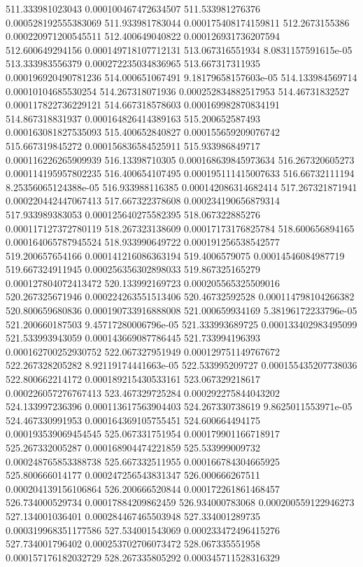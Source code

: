 {511.333981023043 0.000100467472634507
511.533981276376 0.000528192555383069
511.933981783044 0.000175408174159811
512.2673155386 0.000220971200545511
512.400649040822 0.000126931736207594
512.600649294156 0.000149718107712131
513.067316551934 8.0831157591615e-05
513.333983556379 0.000272235034836965
513.667317311935 0.000196920490781236
514.000651067491 9.18179658157603e-05
514.133984569714 0.00010104685530254
514.267318071936 0.000252834882517953
514.46731832527 0.000117822736229121
514.667318578603 0.000169982870834191
514.867318831937 0.000164826414389163
515.200652587493 0.000163081827535093
515.400652840827 0.000155659209076742
515.667319845272 0.000156836584525911
515.933986849717 0.000116226265909939
516.13398710305 0.000168639845973634
516.267320605273 0.000114195957802235
516.400654107495 0.000195111415007633
516.66732111194 8.25356065124388e-05
516.933988116385 0.000142086314682414
517.267321871941 0.000220442447067413
517.667322378608 0.000234190656879314
517.933989383053 0.000125640275582395
518.067322885276 0.000117127372780119
518.267323138609 0.00017173176825784
518.600656894165 0.000164065787945524
518.933990649722 0.000191256538542577
519.200657654166 0.000141216086363194
519.4006579075 0.00014546084987719
519.667324911945 0.000256356302898033
519.867325165279 0.000127804072413472
520.133992169723 0.000205565325509016
520.267325671946 0.000224263551513406
520.46732592528 0.000114798104266382
520.800659680836 0.000190733916888008
521.000659934169 5.38196172233796e-05
521.200660187503 9.45717280006796e-05
521.333993689725 0.000133402983495099
521.533993943059 0.000143669087786445
521.733994196393 0.000162700252930752
522.067327951949 0.000129751149767672
522.267328205282 8.92119174441663e-05
522.533995209727 0.000155435207738036
522.800662214172 0.000189215430533161
523.067329218617 0.000226057276767413
523.467329725284 0.000292275844043202
524.133997236396 0.000113617563904403
524.267330738619 9.8625011553971e-05
524.467330991953 0.000164369105755451
524.600664494175 0.000193539069454545
525.067331751954 0.000179901166718917
525.267332005287 0.000168904474221859
525.533999009732 0.000248765853388738
525.667332511955 0.000166784304665925
525.800666014177 0.000247256543831347
526.000666267511 0.000204139156106864
526.200666520844 0.000172261861468457
526.734000529734 0.00017884209862459
526.934000783068 0.000200559122946273
527.134001036401 0.000284467465503948
527.334001289735 0.000319968351177586
527.534001543069 0.000233472496415276
527.734001796402 0.000253702706073472
528.067335551958 0.000157176182032729
528.267335805292 0.000345711528316329
}
